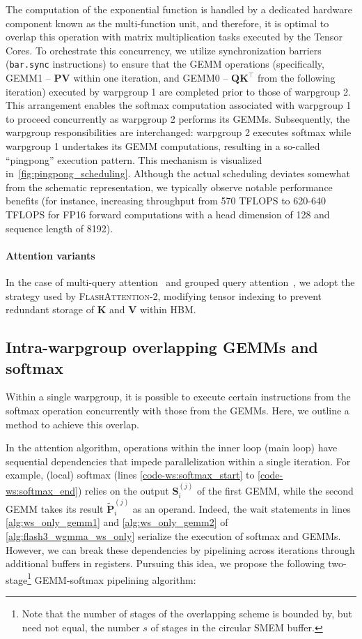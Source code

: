 The computation of the exponential function is handled by a dedicated hardware component known as the multi-function unit, and therefore, it is optimal to overlap this operation with matrix multiplication tasks executed by the Tensor Cores. To orchestrate this concurrency, we utilize synchronization barriers (\texttt{bar.sync} instructions) to ensure that the GEMM operations (specifically, GEMM1 -- $\mathbf{P} \mathbf{V}$ within one iteration, and GEMM0 -- $\mathbf{Q} \mathbf{K}^\top$ from the following iteration) executed by warpgroup 1 are completed prior to those of warpgroup 2. This arrangement enables the softmax computation associated with warpgroup 1 to proceed concurrently as warpgroup 2 performs its GEMMs. Subsequently, the warpgroup responsibilities are interchanged: warpgroup 2 executes softmax while warpgroup 1 undertakes its GEMM computations, resulting in a so-called “pingpong” execution pattern. This mechanism is visualized in~\cref{fig:pingpong_scheduling}. Although the actual scheduling deviates somewhat from the schematic representation, we typically observe notable performance benefits (for instance, increasing throughput from 570 TFLOPS to 620-640 TFLOPS for FP16 forward computations with a head dimension of 128 and sequence length of 8192).

\paragraph{Attention variants} In the case of multi-query attention~\citep{shazeer2019fast} and grouped query attention~\citep{ainslie2023gqa}, we adopt the strategy used by \textsc{FlashAttention-2}, modifying tensor indexing to prevent redundant storage of $\mathbf{K}$ and $\mathbf{V}$ within HBM.

\subsection{Intra-warpgroup overlapping GEMMs and softmax}

Within a single warpgroup, it is possible to execute certain instructions from the softmax operation concurrently with those from the GEMMs. Here, we outline a method to achieve this overlap.

In the attention algorithm, operations within the inner loop (main loop) have sequential dependencies that impede parallelization within a single iteration. For example, (local) softmax (lines \ref{code-ws:softmax_start} to \ref{code-ws:softmax_end}) relies on the output $\mathbf{S}_i^{(j)}$ of the first GEMM, while the second GEMM takes its result $\widetilde{\mathbf{P}}_i^{(j)}$ as an operand. Indeed, the wait statements in lines \ref{alg:ws_only_gemm1} and \ref{alg:ws_only_gemm2} of \cref{alg:flash3_wgmma_ws_only} serialize the execution of softmax and GEMMs. However, we can break these dependencies by pipelining across iterations through additional buffers in registers. Pursuing this idea, we propose the following two-stage\footnote{Note that the number of stages of the overlapping scheme is bounded by, but need not equal, the number $s$ of stages in the circular SMEM buffer.} GEMM-softmax pipelining algorithm:

